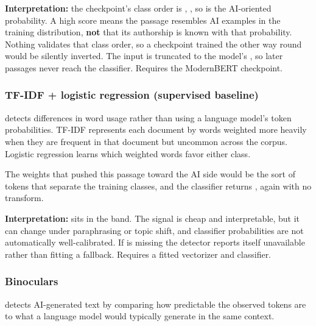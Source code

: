 \textbf{Interpretation:} the checkpoint's class order is
\texttt{}, \texttt{}, so
\texttt{} is the AI-oriented probability. A high score
means the passage resembles AI examples in the training distribution,
\textbf{not} that its authorship is known with that probability. Nothing
validates that class order, so a checkpoint trained the other way round
would be silently inverted. The input is truncated to the model's
\texttt{}, so later passages never reach the
classifier. Requires the \texttt{}
ModernBERT checkpoint.

\subsubsection{TF-IDF + logistic regression (supervised
baseline)}\label{record-DETECTORS-md-tf-idf-logistic-regression-supervised-baseline}

\texttt{} detects differences in word usage
rather than using a language model's token probabilities. TF-IDF
represents each document by words weighted more heavily when they are
frequent in that document but uncommon across the corpus. Logistic
regression learns which weighted words favor either class.

The weights that pushed this passage toward the AI side would be the
sort of tokens that separate the training classes, and the classifier
returns \texttt{}, again with no transform.

\textbf{Interpretation:} \texttt{} sits in the
\texttt{} band. The signal is cheap and
interpretable, but it can change under paraphrasing or topic shift, and
classifier probabilities are not automatically well-calibrated. If
\texttt{} is missing the detector
reports itself unavailable rather than fitting a fallback. Requires a
fitted vectorizer and classifier.

\subsubsection{Binoculars}\label{record-DETECTORS-md-binoculars}

\texttt{} detects AI-generated text by
comparing how predictable the observed tokens are to what a language
model would typically generate in the same context.

